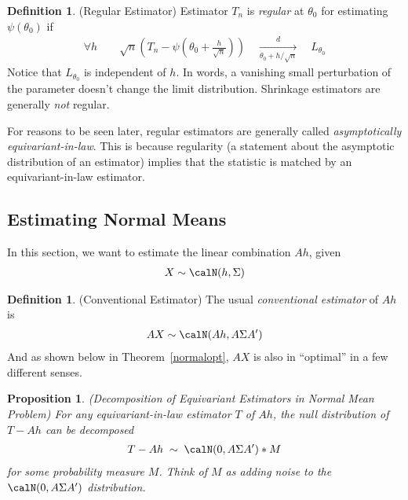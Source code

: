 \documentclass[12pt]{article}
\theoremstyle{plain}
\newtheorem{prop}[thm]{Proposition}
\theoremstyle{definition}
\newtheorem{defn}[thm]{Definition}
\theoremstyle{remark}
\newcommand{\dto}{\xrightarrow{d}}
\begin{document}
\begin{defn}(Regular Estimator)
Estimator $T_n$ is \emph{regular} at $\theta_0$ for
estimating $\psi(\theta_0)$ if
\begin{align*}
  \forall h
  \qquad
  \sqrt{n}
  \left(
  T_n
  -
  \psi\left(
  \theta_0 + \frac{h}{\sqrt{n}}
  \right)
  \right)
  \quad\underset{\theta_0+h/\sqrt{n}}{\dto}\quad
  L_{\theta_0}
\end{align*}
Notice that $L_{\theta_0}$ is independent of $h$.
In words, a vanishing small perturbation of the parameter doesn't change
the limit distribution.
Shrinkage estimators are generally \emph{not} regular.

For reasons to be seen later, regular estimators are generally called
\emph{asymptotically equivariant-in-law}.
This is because regularity (a statement about the asymptotic
distribution of an estimator) implies that the statistic is matched by
an equivariant-in-law estimator.
\end{defn}


\clearpage
\subsection{Estimating Normal Means}


In this section, we want to estimate the linear combination $Ah$, given
\begin{align}
  X \sim \calN(h,\Sigma)
  \label{limitobs}
\end{align}

\begin{defn}(Conventional Estimator)
The usual \emph{conventional estimator} of $Ah$ is
\begin{align*}
  AX
  \sim \calN(Ah, A\Sigma A')
\end{align*}
And as shown below in Theorem~\ref{normalopt}, $AX$ is also in
``optimal'' in a few different senses.
\end{defn}

\begin{prop}
\label{decompequivariant}
\emph{(Decomposition of Equivariant Estimators in Normal Mean Problem)}
For any equivariant-in-law estimator $T$ of $Ah$, the null distribution
of $T-Ah$ can be decomposed
\begin{align}
  T-Ah
  \;
  \sim
  \;
  \calN(0,A\Sigma A') * M
  \label{eildecomp}
\end{align}
for some probability measure $M$.
Think of $M$ as adding noise to the $\calN(0,A\Sigma A')$ distribution.
\end{prop}
\end{document}
